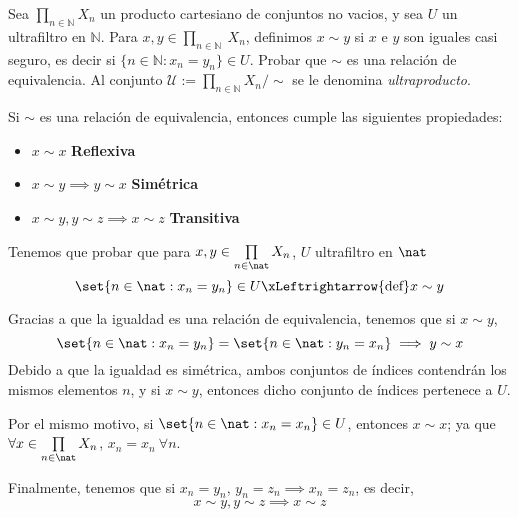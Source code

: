\begin{problem}
Sea  $\prod_{n\in \mathbb{N}} X_n$ un producto cartesiano de conjuntos no vacios, y sea $U$ un ultrafiltro en $\mathbb{N}$.
Para $x,y \in  \prod_{n\in \mathbb{N}}\ X_n$, definimos $x\sim y$ si $x$ e $y$ son iguales casi seguro, es
decir si $\{n\in \mathbb{N}: x_n = y_n\}\in U$. Probar que $\sim$ es una relación de equivalencia.
Al conjunto $\mathcal{U}:=\prod_{n\in \mathbb{N}} X_n/\sim$ se le denomina {\em ultraproducto}.

\solution

Si $\sim$ es una relación de equivalencia, entonces cumple las siguientes propiedades:
\begin{itemize}
	\item $x \sim x$ {\bf Reflexiva}
	\item $x \sim y \implies y \sim x$ {\bf Simétrica}
	\item $x \sim y, y \sim z \implies x \sim z$ {\bf Transitiva}
\end{itemize}

Tenemos que probar que para $x,y \in \prod\limits_{n \in \nat} X_n$, $U$ ultrafiltro en $\nat$
\[ \set{ n \in \nat : x_n = y_n} \in U \xLeftrightarrow{\text{def}} x \sim y \]

Gracias a que la igualdad es una relación de equivalencia, tenemos que si $x \sim y$,
\[\set{ n \in \nat : x_n = y_n} = \set{ n \in \nat : y_n = x_n} \implies y \sim x \]
Debido a que la igualdad es simétrica, ambos conjuntos de índices contendrán los mismos elementos $n$, y si $x\sim y$, entonces dicho conjunto de índices pertenece a $U$.

Por el mismo motivo, si $\set{ n \in \nat : x_n = x_n} \in U$, entonces $x \sim x$; ya que\\
$\forall x \in \prod\limits_{n \in \nat} X_n$, $x_n = x_n \ \forall n$.

Finalmente, tenemos que si $x_n = y_n$, $y_n = z_n \implies x_n = z_n$, es decir,
\[x \sim y, y \sim z \implies x \sim z\]

\end{problem}

